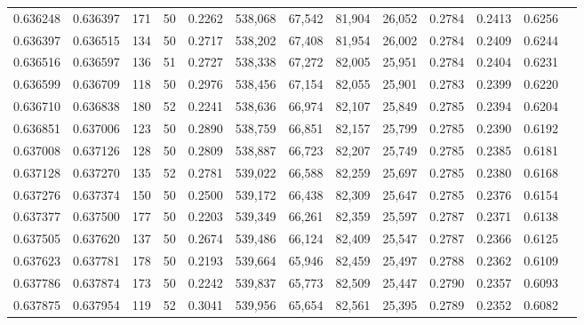 \begin{tabular}{rrrrrrrrrrrrr}
0.636248 & 0.636397 &   171 &  50 &                                     0.2262 & 538,068 &  67,542 &  81,904 &  26,052 & 0.2784 & 0.2413 & 0.6256 \\
0.636397 & 0.636515 &   134 &  50 &                                     0.2717 & 538,202 &  67,408 &  81,954 &  26,002 & 0.2784 & 0.2409 & 0.6244 \\
0.636516 & 0.636597 &   136 &  51 &                                     0.2727 & 538,338 &  67,272 &  82,005 &  25,951 & 0.2784 & 0.2404 & 0.6231 \\
0.636599 & 0.636709 &   118 &  50 &                                     0.2976 & 538,456 &  67,154 &  82,055 &  25,901 & 0.2783 & 0.2399 & 0.6220 \\
0.636710 & 0.636838 &   180 &  52 &                                     0.2241 & 538,636 &  66,974 &  82,107 &  25,849 & 0.2785 & 0.2394 & 0.6204 \\
0.636851 & 0.637006 &   123 &  50 &                                     0.2890 & 538,759 &  66,851 &  82,157 &  25,799 & 0.2785 & 0.2390 & 0.6192 \\
0.637008 & 0.637126 &   128 &  50 &                                     0.2809 & 538,887 &  66,723 &  82,207 &  25,749 & 0.2785 & 0.2385 & 0.6181 \\
0.637128 & 0.637270 &   135 &  52 &                                     0.2781 & 539,022 &  66,588 &  82,259 &  25,697 & 0.2785 & 0.2380 & 0.6168 \\
0.637276 & 0.637374 &   150 &  50 &                                     0.2500 & 539,172 &  66,438 &  82,309 &  25,647 & 0.2785 & 0.2376 & 0.6154 \\
0.637377 & 0.637500 &   177 &  50 &                                     0.2203 & 539,349 &  66,261 &  82,359 &  25,597 & 0.2787 & 0.2371 & 0.6138 \\
0.637505 & 0.637620 &   137 &  50 &                                     0.2674 & 539,486 &  66,124 &  82,409 &  25,547 & 0.2787 & 0.2366 & 0.6125 \\
0.637623 & 0.637781 &   178 &  50 &                                     0.2193 & 539,664 &  65,946 &  82,459 &  25,497 & 0.2788 & 0.2362 & 0.6109 \\
0.637786 & 0.637874 &   173 &  50 &                                     0.2242 & 539,837 &  65,773 &  82,509 &  25,447 & 0.2790 & 0.2357 & 0.6093 \\
0.637875 & 0.637954 &   119 &  52 &                                     0.3041 & 539,956 &  65,654 &  82,561 &  25,395 & 0.2789 & 0.2352 & 0.6082 \\

\end{tabular}
